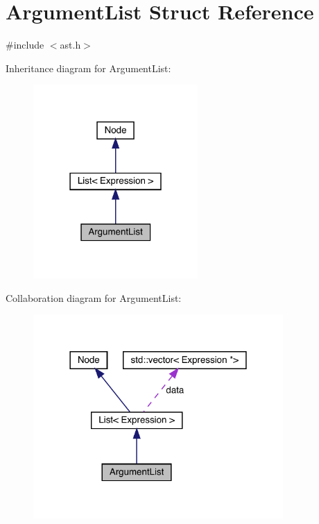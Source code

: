 \hypertarget{struct_argument_list}{}\section{Argument\+List Struct Reference}
\label{struct_argument_list}


{\ttfamily \#include $<$ast.\+h$>$}



Inheritance diagram for Argument\+List\+:
\nopagebreak
\begin{figure}[H]
\begin{center}
\leavevmode
\includegraphics[width=178pt]{struct_argument_list__inherit__graph}
\end{center}
\end{figure}


Collaboration diagram for Argument\+List\+:
\nopagebreak
\begin{figure}[H]
\begin{center}
\leavevmode
\includegraphics[width=270pt]{struct_argument_list__coll__graph}
\end{center}
\end{figure}
